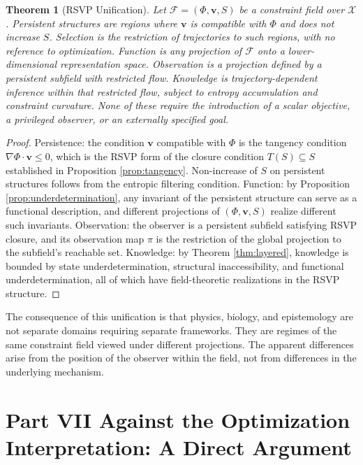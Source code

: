 \documentclass[12pt, a4paper, oneside]{article}
\theoremstyle{plain}
\newtheorem{theorem}{Theorem}[section]
\theoremstyle{definition}
\theoremstyle{remark}
\newcommand{\X}{\mathcal{X}}
\newcommand{\T}{T}
\newcommand{\proj}{\pi}
\begin{document}
\begin{theorem}[RSVP Unification]
\label{thm:rsvp-unification}
Let $\mathcal{F} = (\Phi, \mathbf{v}, S)$ be a constraint field over $\X$. Persistent structures are regions where $\mathbf{v}$ is compatible with $\Phi$ and does not increase $S$. Selection is the restriction of trajectories to such regions, with no reference to optimization. Function is any projection of $\mathcal{F}$ onto a lower-dimensional representation space. Observation is a projection defined by a persistent subfield with restricted flow. Knowledge is trajectory-dependent inference within that restricted flow, subject to entropy accumulation and constraint curvature. None of these require the introduction of a scalar objective, a privileged observer, or an externally specified goal.
\end{theorem}

\begin{proof}
Persistence: the condition $\mathbf{v}$ compatible with $\Phi$ is the tangency condition $\nabla \Phi \cdot \mathbf{v} \leq 0$, which is the RSVP form of the closure condition $\T(S) \subseteq S$ established in Proposition \ref{prop:tangency}. Non-increase of $S$ on persistent structures follows from the entropic filtering condition. Function: by Proposition \ref{prop:underdetermination}, any invariant of the persistent structure can serve as a functional description, and different projections of $(\Phi, \mathbf{v}, S)$ realize different such invariants. Observation: the observer is a persistent subfield satisfying RSVP closure, and its observation map $\proj$ is the restriction of the global projection to the subfield's reachable set. Knowledge: by Theorem \ref{thm:layered}, knowledge is bounded by state underdetermination, structural inaccessibility, and functional underdetermination, all of which have field-theoretic realizations in the RSVP structure.
\end{proof}

The consequence of this unification is that physics, biology, and epistemology are not separate domains requiring separate frameworks. They are regimes of the same constraint field viewed under different projections. The apparent differences arise from the position of the observer within the field, not from differences in the underlying mechanism.

\section*{Part VII \quad Against the Optimization Interpretation: A Direct Argument}
\end{document}

